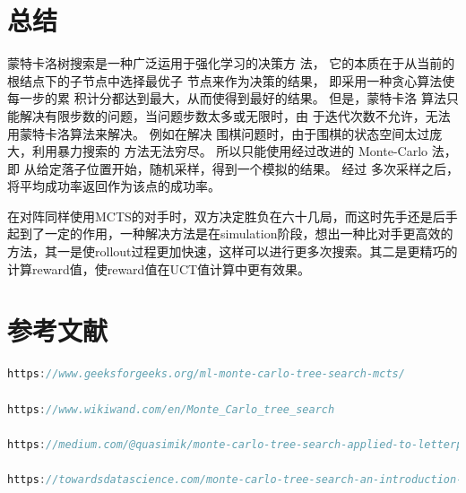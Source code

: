 \documentclass{ctexrep}
\begin{document}
{\let\clearpage\relax\chapter*{总结}}
蒙特卡洛树搜索是一种广泛运用于强化学习的决策方
法， 它的本质在于从当前的根结点下的子节点中选择最优子
节点来作为决策的结果， 即采用一种贪心算法使每一步的累
积计分都达到最大，从而使得到最好的结果。 但是，蒙特卡洛
算法只能解决有限步数的问题，当问题步数太多或无限时，由
于迭代次数不允许，无法用蒙特卡洛算法来解决。 例如在解决
围棋问题时，由于围棋的状态空间太过庞大，利用暴力搜索的
方法无法穷尽。 所以只能使用经过改进的 Monte-Carlo 法，即
从给定落子位置开始，随机采样，得到一个模拟的结果。 经过
多次采样之后，将平均成功率返回作为该点的成功率。











在对阵同样使用MCTS的对手时，双方决定胜负在六十几局，而这时先手还是后手起到了一定的作用，一种解决方法是在simulation阶段，想出一种比对手更高效的方法，其一是使rollout过程更加快速，这样可以进行更多次搜索。其二是更精巧的计算reward值，使reward值在UCT值计算中更有效果。
\chapter{参考文献}


\begin{lstlisting}[language=java]
https://www.geeksforgeeks.org/ml-monte-carlo-tree-search-mcts/

https://www.wikiwand.com/en/Monte_Carlo_tree_search

https://medium.com/@quasimik/monte-carlo-tree-search-applied-to-letterpress-34f41c86e238

https://towardsdatascience.com/monte-carlo-tree-search-an-introduction-503d8c04e168

\end{lstlisting}



  
\end{document}
